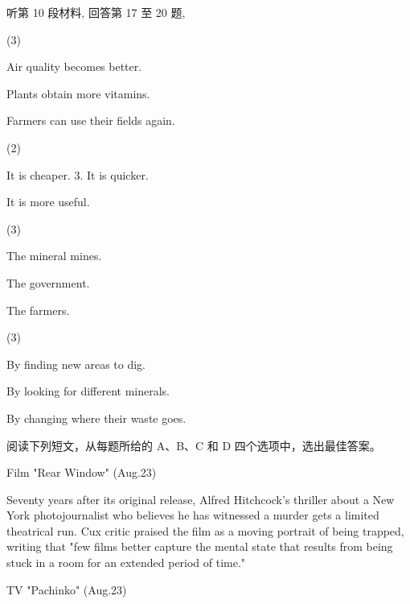\documentclass{英语试卷}
\begin{document}
\par 听第 10 段材料, 回答第 17 至 20 题,\par
{}
\begin{choices}(3)
  \item Air quality becomes better.
  \item Plants obtain more vitamins.
  \item Farmers can use their fields again.
\end{choices}
\begin{choices}(2)
  \item It is cheaper. 3. It is quicker.
  \item It is more useful.
\end{choices}
\begin{choices}(3)
  \item The mineral mines.
  \item The government.
  \item The farmers.
\end{choices}
\begin{choices}(3)
  \item By finding new areas to dig.
  \item By looking for different minerals.
  \item By changing where their waste goes.
\end{choices}
\par 阅读下列短文，从每题所给的 A、B、C 和 D 四个选项中，选出最佳答案。\par
{}
\par Film "Rear Window" (Aug.23)\par
\par Seventy years after its original release, Alfred Hitchcock's thriller about a New York photojournalist who believes he has witnessed a murder gets a limited theatrical run. Cux critic praised the film as a moving portrait of being trapped, writing that "few films better capture the mental state that results from being stuck in a room for an extended period of time."\par
\par TV "Pachinko" (Aug.23)\par
\end{document}
